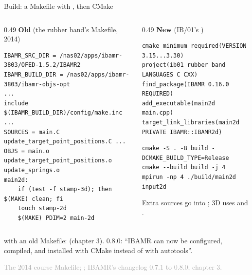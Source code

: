 \documentclass[aspectratio=169,11pt]{beamer}
\newcommand{\sourcecredit}[1]{\vfill\begin{flushright}\tiny\textcolor{DarkGray}{#1}\end{flushright}}
\begin{document}
\begin{frame}[fragile]{Build: a Makefile with , then CMake}
\label{fr:build}
\begin{columns}[T,onlytextwidth]
\begin{column}{0.49\textwidth}
\textbf{Old} (the rubber band's Makefile, 2014)
\begin{lstlisting}[style=maketiny]
IBAMR_SRC_DIR = /nas02/apps/ibamr-3803/OFED-1.5.2/IBAMR2
IBAMR_BUILD_DIR = /nas02/apps/ibamr-3803/ibamr-objs-opt
...
include $(IBAMR_BUILD_DIR)/config/make.inc
...
SOURCES = main.C update_target_point_positions.C ...
OBJS = main.o update_target_point_positions.o update_springs.o
main2d:
	if (test -f stamp-3d); then $(MAKE) clean; fi
	touch stamp-2d
	$(MAKE) PDIM=2 main-2d
\end{lstlisting}
\end{column}
\begin{column}{0.49\textwidth}
\textbf{New} (IB/01's )
\begin{lstlisting}[style=maketiny]
cmake_minimum_required(VERSION 3.15...3.30)
project(ib01_rubber_band LANGUAGES C CXX)
find_package(IBAMR 0.16.0 REQUIRED)
add_executable(main2d main.cpp)
target_link_libraries(main2d PRIVATE IBAMR::IBAMR2d)
\end{lstlisting}
\begin{lstlisting}[style=shell,basicstyle=\ttfamily\tiny\color{BlackGray}]
cmake -S . -B build -DCMAKE_BUILD_TYPE=Release
cmake --build build -j 4
mpirun -np 4 ./build/main2d input2d
\end{lstlisting}
\footnotesize Extra sources go into ; 3D uses  and .
\end{column}
\end{columns}
\vspace{1mm}
\footnotesize {} with an old Makefile:  (chapter 3).  0.8.0: ``IBAMR can now be configured, compiled, and installed with CMake instead of with autotools''.
\sourcecredit{The 2014 course Makefile; \code{examples/IB/01-rubber-band}; IBAMR's changelog 0.7.1 to 0.8.0; chapter 3.}
\end{frame}
\end{document}

